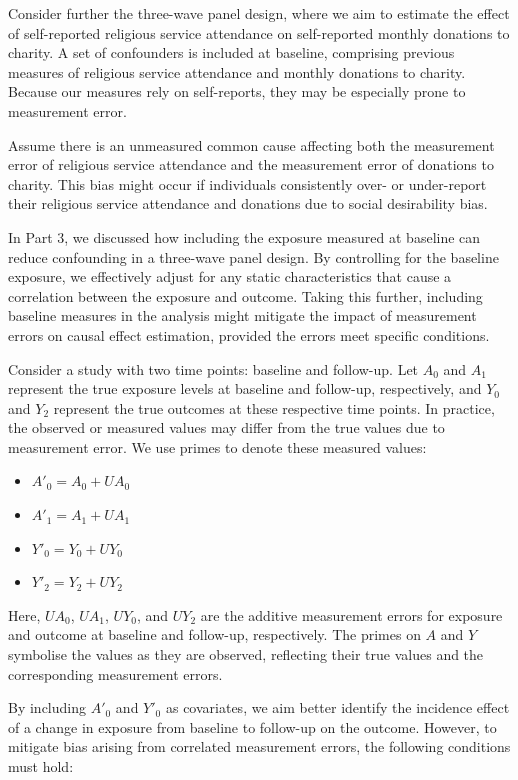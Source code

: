 \documentclass[
  singlecolumn]{article}
\providecommand{\tightlist}{%
  \setlength{\itemsep}{0pt}\setlength{\parskip}{0pt}}\usepackage{longtable,booktabs,array}
\begin{document}
Consider further the three-wave panel design, where we aim to estimate
the effect of self-reported religious service attendance on
self-reported monthly donations to charity. A set of confounders is
included at baseline, comprising previous measures of religious service
attendance and monthly donations to charity. Because our measures rely
on self-reports, they may be especially prone to measurement error.

Assume there is an unmeasured common cause affecting both the
measurement error of religious service attendance and the measurement
error of donations to charity. This bias might occur if individuals
consistently over- or under-report their religious service attendance
and donations due to social desirability bias.

In Part 3, we discussed how including the exposure measured at baseline
can reduce confounding in a three-wave panel design. By controlling for
the baseline exposure, we effectively adjust for any static
characteristics that cause a correlation between the exposure and
outcome. Taking this further, including baseline measures in the
analysis might mitigate the impact of measurement errors on causal
effect estimation, provided the errors meet specific conditions.

Consider a study with two time points: baseline and follow-up. Let
\(A_0\) and \(A_1\) represent the true exposure levels at baseline and
follow-up, respectively, and \(Y_0\) and \(Y_2\) represent the true
outcomes at these respective time points. In practice, the observed or
measured values may differ from the true values due to measurement
error. We use primes to denote these measured values:

\begin{itemize}
\tightlist
\item
  \(A'_0 = A_0 + UA_0\)
\item
  \(A'_1 = A_1 + UA_1\)
\item
  \(Y'_0 = Y_0 + UY_0\)
\item
  \(Y'_2 = Y_2 + UY_2\)
\end{itemize}

Here, \(UA_0\), \(UA_1\), \(UY_0\), and \(UY_2\) are the additive
measurement errors for exposure and outcome at baseline and follow-up,
respectively. The primes on \(A\) and \(Y\) symbolise the values as they
are observed, reflecting their true values and the corresponding
measurement errors.

By including \(A'_0\) and \(Y'_0\) as covariates, we aim better identify
the incidence effect of a change in exposure from baseline to follow-up
on the outcome. However, to mitigate bias arising from correlated
measurement errors, the following conditions must hold:
\end{document}
